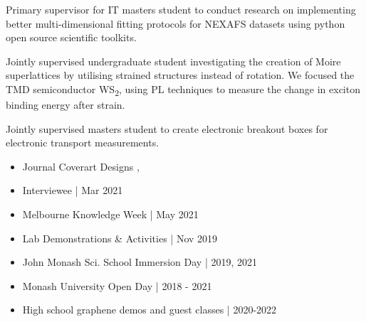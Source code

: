 \documentclass[10pt,a4paper,ragged2e,withhyper]{altacv}
\begin{document}
			\divider
				

				Primary supervisor for IT masters student to conduct research on implementing better multi-dimensional fitting protocols for NEXAFS datasets using python open source scientific toolkits.

				\divider

				Jointly supervised undergraduate student investigating the creation of Moire superlattices by utilising strained structures instead of rotation. We focused the TMD semiconductor WS\textsubscript{2}, using PL techniques to measure the change in exciton binding energy after strain.
			
				\divider
				
				Jointly supervised masters student to create electronic breakout boxes for electronic transport measurements.
				
			\divider

			\vspace{-1em}
			\begin{multicols}{2}
			\begin{itemize}
				\item Journal Coverart Designs ,
				\item Interviewee | Mar 2021
				\item Melbourne Knowledge Week | May 2021
				\item Lab Demonstrations \& Activities | Nov 2019
				\item John Monash Sci. School Immersion Day | 2019, 2021
				\item Monash University Open Day | 2018 - 2021
				\item High school graphene demos and guest classes | 2020-2022
			\end{itemize}
			\end{multicols}
			
\end{document}
